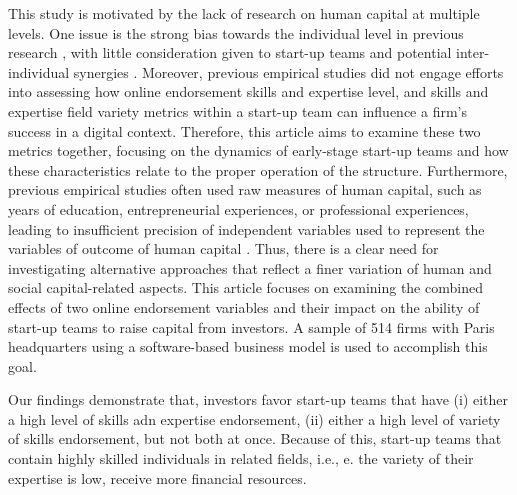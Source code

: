 \documentclass[12pt]{article}
\begin{document}
This study is motivated by the lack of research on human capital at multiple levels. One issue is the strong bias towards the individual level in previous research \citep{marvel2016human}, with little consideration given to start-up teams and potential inter-individual synergies \citep{knight2020start}. Moreover, previous empirical studies did not engage efforts into assessing how online endorsement skills and expertise level, and skills and expertise field variety metrics within a start-up team can influence a firm's success in a digital context. Therefore, this article aims to examine these two metrics together, focusing on the dynamics of early-stage start-up teams and how these characteristics relate to the proper operation of the structure. Furthermore, previous empirical studies often used raw measures of human capital, such as years of education, entrepreneurial experiences, or professional experiences, leading to insufficient precision of independent variables used to represent the variables of outcome of human capital \citep{harrison2007s}. Thus, there is a clear need for investigating alternative approaches that reflect a finer variation of human and social capital-related aspects. This article focuses on examining the combined effects of two online endorsement variables and their impact on the ability of start-up teams to raise capital from investors. A sample of 514 firms with Paris headquarters using a software-based business model is used to accomplish this goal.

Our findings demonstrate that, investors favor start-up teams that have (i) either a high level of skills adn expertise endorsement, (ii) either a high level of variety of skills endorsement, but not both at once. Because of this, start-up teams that contain highly skilled individuals in related fields, i.e., e. the variety of their expertise is low, receive more financial resources.
\end{document}
